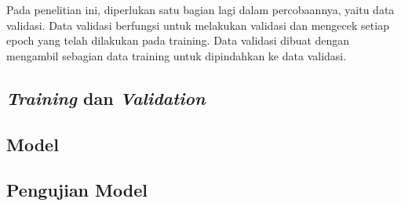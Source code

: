

Pada penelitian ini, diperlukan satu bagian lagi dalam percobaannya, yaitu data validasi. Data validasi 
berfungsi untuk melakukan validasi dan mengecek setiap epoch yang telah dilakukan pada training. Data 
validasi dibuat dengan mengambil sebagian data training untuk dipindahkan ke data validasi.



\subsection{\emph{Training} dan \emph{Validation}}

\subsection{Model}

\subsection{Pengujian Model}





% 

